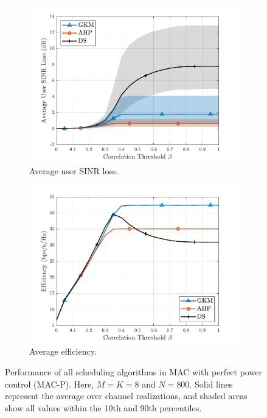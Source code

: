 \begin{figure}[ht]
\centering
\begin{subfigure}{0.48\linewidth}
	\centering
	\includegraphics[width=.95\linewidth]{./figs/usch_figs/MACU_AvgUserSINRLoss_normalizedChannelPwr_noPwrCtrl_M8_N800_nSim10_nChannel100_K08_sigman2_-20.pdf}
	\caption{Average user SINR loss.}\label{usch:fig:MACU_sinrLoss_M8_N800}
\end{subfigure}
\begin{subfigure}{0.48\linewidth}
	\centering
	\includegraphics[width=.95\linewidth]{./figs/usch_figs/MACU_NormalizedEfficiency_normalizedChannelPwr_noPwrCtrl_M8_N800_nSim10_nChannel100_K08_sigman2_-20.pdf}
	\caption{Average efficiency. }
	\label{usch:fig:MACU_efficiency_M8_N800}
\end{subfigure}
\caption[Performance of all scheduling algorithms in MAC with perfect power control (MAC-P).]{Performance of all scheduling algorithms in MAC with perfect power control (MAC-P). Here, $M=K=8$ and $N=800$. Solid lines represent the average over channel realizations, and shaded areas show all values within the 10th and 90th percentiles.}
\label{usch:fig:MACU_M8_N800}
\end{figure}
